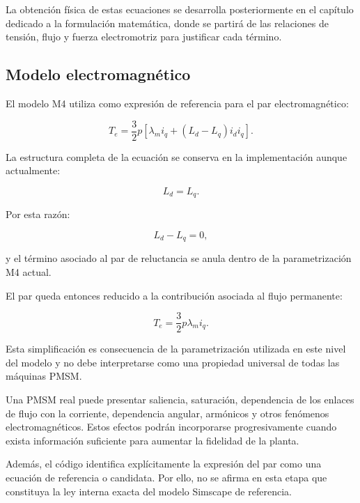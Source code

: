 La obtención física de estas ecuaciones se desarrolla posteriormente en el capítulo dedicado a la formulación matemática, donde se partirá de las relaciones de tensión, flujo y fuerza electromotriz para justificar cada término.

\subsection{Modelo electromagnético}

El modelo M4 utiliza como expresión de referencia para el par electromagnético:

\begin{equation}
T_e=
\frac{3}{2}p
\left[
\lambda_mi_q+
(L_d-L_q)i_di_q
\right].
\end{equation}

La estructura completa de la ecuación se conserva en la implementación aunque actualmente:

\begin{equation}
L_d=L_q.
\end{equation}

Por esta razón:

\begin{equation}
L_d-L_q=0,
\end{equation}

y el término asociado al par de reluctancia se anula dentro de la parametrización M4 actual.

El par queda entonces reducido a la contribución asociada al flujo permanente:

\begin{equation}
T_e=
\frac{3}{2}p\lambda_mi_q.
\end{equation}

Esta simplificación es consecuencia de la parametrización utilizada en este nivel del modelo y no debe interpretarse como una propiedad universal de todas las máquinas PMSM.

Una PMSM real puede presentar saliencia, saturación, dependencia de los enlaces de flujo con la corriente, dependencia angular, armónicos y otros fenómenos electromagnéticos. Estos efectos podrán incorporarse progresivamente cuando exista información suficiente para aumentar la fidelidad de la planta.

Además, el código identifica explícitamente la expresión del par como una ecuación de referencia o candidata. Por ello, no se afirma en esta etapa que constituya la ley interna exacta del modelo Simscape de referencia.

